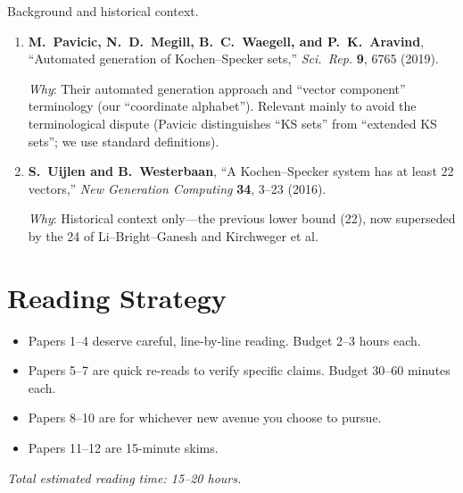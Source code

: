 \documentclass[11pt,a4paper]{article}
\begin{document}
Background and historical context.

\begin{enumerate}[label=\textbf{\arabic*.}, leftmargin=2em, start=11]

\item \textbf{M.~Pavicic, N.~D.~Megill, B.~C.~Waegell, and P.~K.~Aravind},
``Automated generation of Kochen--Specker sets,''
\textit{Sci.\ Rep.} \textbf{9}, 6765 (2019).

\smallskip\noindent
\textit{Why}: Their automated generation approach and ``vector component'' terminology (our ``coordinate alphabet'').  Relevant mainly to avoid the terminological dispute (Pavicic distinguishes ``KS sets'' from ``extended KS sets''; we use standard definitions).

\bigskip

\item \textbf{S.~Uijlen and B.~Westerbaan},
``A Kochen--Specker system has at least 22 vectors,''
\textit{New Generation Computing} \textbf{34}, 3--23 (2016).

\smallskip\noindent
\textit{Why}: Historical context only---the previous lower bound (22), now superseded by the 24 of Li--Bright--Ganesh and Kirchweger et al.

\end{enumerate}

\bigskip

\section*{Reading Strategy}

\begin{itemize}[leftmargin=1.5em]
\item Papers 1--4 deserve careful, line-by-line reading.  Budget 2--3 hours each.
\item Papers 5--7 are quick re-reads to verify specific claims.  Budget 30--60 minutes each.
\item Papers 8--10 are for whichever new avenue you choose to pursue.
\item Papers 11--12 are 15-minute skims.
\end{itemize}

\medskip
\noindent\textit{Total estimated reading time: 15--20 hours.}
\end{document}
